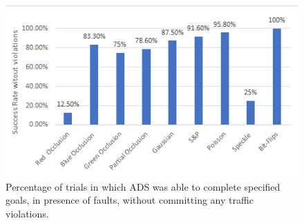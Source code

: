 \begin{figure}  
	\vspace{1.0em}
	\centering
	\includegraphics[scale=0.7]{no_violations}
	\vspace{-0.5em}
	\caption{Percentage of trials in which ADS was able to complete specified goals, in presence of faults, without committing any traffic violations.}
	\label{fig:no_violations}
	\vspace{-1.5em}
\end{figure}





